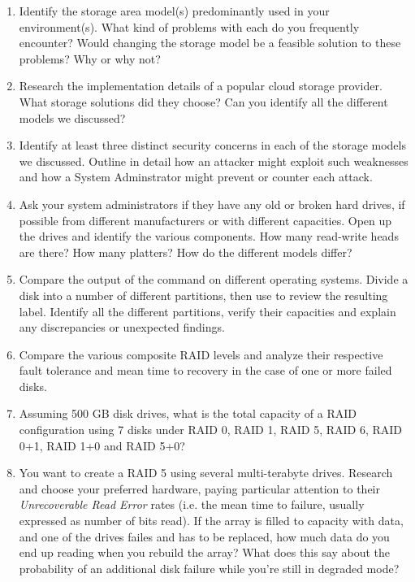 \begin{enumerate}

\item
Identify the storage area model(s) predominantly used in your
environment(s).  What kind of problems with each do you frequently
encounter?  Would changing the storage model be a feasible solution to
these problems?  Why or why not?

\item
Research the implementation details of a popular cloud storage provider.
What storage solutions did they choose?  Can you identify all the
different models we discussed?

\item
Identify at least three distinct security concerns in each of the storage
models we discussed.  Outline in detail how an attacker might exploit such
weaknesses and how a System Adminstrator might prevent or counter each
attack.

\item
\label{prob:disks:hdds}
Ask your system administrators if they have any old or broken hard drives,
if possible from different manufacturers or with different capacities.
Open up the drives and identify the various components.  How many
read-write heads are there?  How many platters?  How do the different
models differ?

\item
\label{prob:disks:disklabel}
Compare the output of the  command on different operating
systems.  Divide a disk into a number of different partitions, then use
 to review the resulting label.  Identify all the
different partitions, verify their capacities and explain any
discrepancies or unexpected findings.

\item
Compare the various composite RAID levels and analyze their respective
fault tolerance and mean time to recovery in the case of one or more
failed disks.

\item
Assuming 500 GB disk drives, what is the total capacity of a RAID
configuration using 7 disks under RAID 0, RAID 1, RAID 5, RAID 6, RAID
0+1, RAID 1+0 and RAID 5+0?

\item
You want to create a RAID 5 using several multi-terabyte
drives.  Research and choose your preferred hardware,
paying particular attention to their {\em
Unrecoverable Read Error} rates (i.e. the mean time to failure, usually
expressed as number of bits read).  If the array is
filled to capacity with data, and one of the drives
failes and has to be replaced, how much data do you
end up reading when you rebuild the array?  What does
this say about the probability of an additional disk
failure while you're still in degraded mode?


\end{enumerate}
